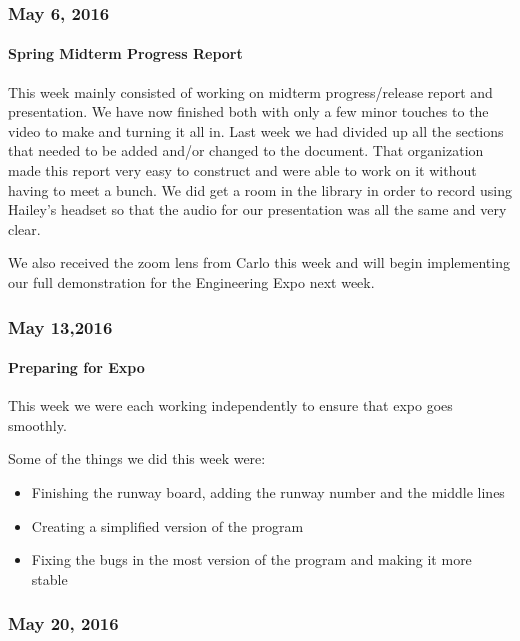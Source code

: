 \subsubsection{May 6, 2016}
\paragraph{Spring Midterm Progress Report}
This week mainly consisted of working on midterm progress/release report and presentation. We have now finished both with only a few minor touches to the video to make and turning it all in. Last week we had divided up all the sections that needed to be added and/or changed to the document. That organization made this report very easy to construct and were able to work on it without having to meet a bunch. We did get a room in the library in order to record using Hailey's headset so that the audio for our presentation was all the same and very clear. 
\par
We also received the zoom lens from Carlo this week and will begin implementing our full demonstration for the Engineering Expo next week.\\

\subsubsection{May 13,2016}
\paragraph{Preparing for Expo}
This week we were each working independently to ensure that expo goes smoothly.
\par
Some of the things we did this week were:
\begin{itemize}[leftmargin=2cm,labelindent=2cm]
\item Finishing the runway board, adding the runway number and the middle lines
\item Creating a simplified version of the program
\item Fixing the bugs in the most version of the program and making it more stable\\
\end{itemize}

\subsubsection{May 20, 2016}
